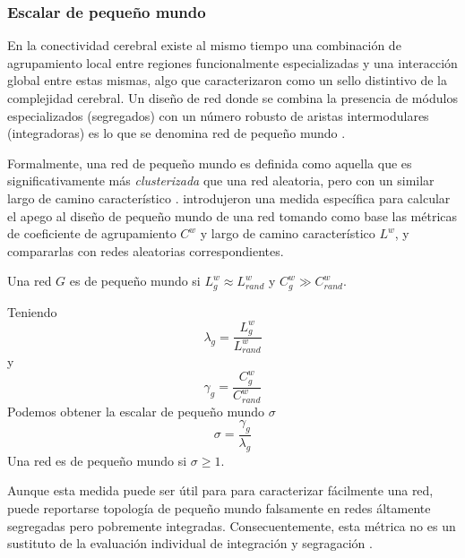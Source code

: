 \subsubsection{Escalar de pequeño mundo}
En la conectividad cerebral existe al mismo tiempo una combinación de agrupamiento local entre regiones funcionalmente especializadas y una interacción global entre estas mismas, algo que \textcite{Tononi1994} caracterizaron como un sello distintivo de la complejidad cerebral.
Un diseño de red donde se combina la presencia de módulos especializados (segregados) con un número robusto de aristas intermodulares (integradoras) es lo que se denomina red de pequeño mundo \parencite{Rubinov2010}. \par
Formalmente, una red de pequeño mundo es definida como aquella que es significativamente más \textit{clusterizada} que una red aleatoria, pero con un similar largo de camino característico \parencite{Watts1998}.
\textcite{Humphries2008} introdujeron una medida específica para calcular el apego al diseño de pequeño mundo de una red tomando como base las métricas de coeficiente de agrupamiento $C^w$ y largo de camino característico $L^w$, y compararlas con redes aleatorias correspondientes.\par
Una red $G$ es de pequeño mundo si $L_g^w \approx L_{rand}^w$ y $C_g^w \gg C_{rand}^w$. \par
Teniendo
\begin{equation}\label{eqLambda}
    \lambda_g=\frac{L_g^w}{L_{rand}^w}
\end{equation}
y
\begin{equation}\label{eqGamma}
    \gamma_g=\frac{C_g^w}{C_{rand}^w}
\end{equation}
Podemos obtener la escalar de pequeño mundo $\sigma$
\begin{equation}\label{eqSW}
    \sigma=\frac{\gamma_g}{\lambda_g}
\end{equation}
Una red es de pequeño mundo si $\sigma \geq 1$.\par
Aunque esta medida puede ser útil para para caracterizar fácilmente una red, puede reportarse topología de pequeño mundo falsamente en redes áltamente segregadas pero pobremente integradas.
Consecuentemente, esta métrica no es un sustituto de la evaluación individual de integración y segragación \parencite{Rubinov2010}.

